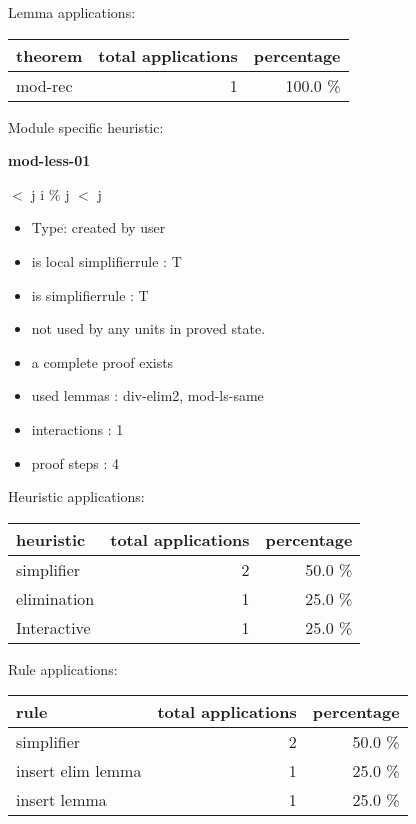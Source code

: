 \documentclass[a4paper]{article}
\begin{document}
Lemma applications:

\begin{supertabular}{l|r|r}
theorem	        & total applications & percentage \\ \hline
mod-rec & 1 & 100.0 \% \\

\end{supertabular}

Module specific heuristic:

\pagebreak

{\LARGE\bf mod-less-01}\label{lemma-mod-less-01}

\medskip

  $<$ j \Imp i \% j $<$ j

\begin{itemize}

\item Type: created by user

\item is local simplifierrule : T
\item is simplifierrule : T
\item not used by any units in proved state.
\item       a complete proof exists
\item       used lemmas  : div-elim2, mod-ls-same
\item       interactions : 1
\item       proof steps  : 4
\end{itemize}

\medskip


Heuristic applications:

\begin{supertabular}{l|r|r}
heuristic	& total applications & percentage \\ \hline
simplifier & 2 & 50.0 \% \\
elimination & 1 & 25.0 \% \\
Interactive & 1 & 25.0 \% \\

\end{supertabular}

Rule applications:

\begin{supertabular}{l|r|r}
rule	        & total applications & percentage \\ \hline
simplifier & 2 & 50.0 \% \\
insert elim lemma & 1 & 25.0 \% \\
insert lemma & 1 & 25.0 \% \\

\end{supertabular}
\end{document}
